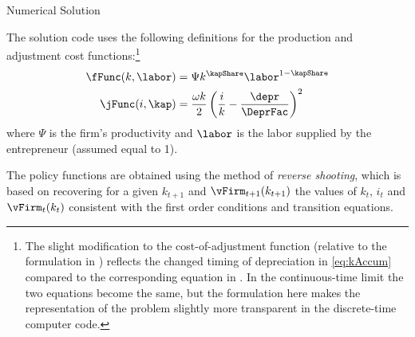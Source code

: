
\centerline{\Large Numerical Solution} \vspace{0.5in}



The solution code uses the following definitions for the production and adjustment cost functions:\footnote{The slight modification to the cost-of-adjustment function (relative to the formulation in ) reflects the changed timing of depreciation in \eqref{eq:kAccum} compared to the corresponding equation in .  In the continuous-time limit the two equations become the same, but the formulation here makes the representation of the problem slightly more transparent in the discrete-time computer code.}
\begin{equation}\begin{gathered}\begin{aligned}
\fFunc(k,\labor)&= \Psi k^\kapShare \labor^{1-\kapShare} \label{eq:fjFuncs} \\
\jFunc(i,\kap)&=\frac{\omega k}{2}\left(\frac{i}{k}-\frac{\depr}{\DeprFac}\right)^2 
\end{aligned}\end{gathered}\end{equation}
where $\Psi$ is the firm's productivity and $\labor$ is the labor supplied by the entrepreneur (assumed equal to 1).

The policy functions are obtained using the method of \textit{reverse
  shooting}, which is based on recovering for a given $k_{t+1}$ and
$\vFirm_{t+1}(k_{t+1})$ the values of $k_t$, $i_t$ and
$\vFirm_{t}(k_{t})$ consistent with the first order conditions and
transition equations. 

